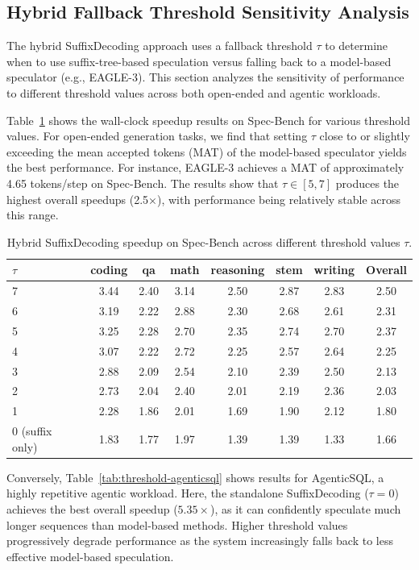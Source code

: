 \subsection{Hybrid Fallback Threshold Sensitivity Analysis}
\label{sec:threshold-sensitivity}

The hybrid SuffixDecoding approach uses a fallback threshold $\tau$ to determine when to use suffix-tree-based speculation versus falling back to a model-based speculator (e.g., EAGLE-3). This section analyzes the sensitivity of performance to different threshold values across both open-ended and agentic workloads.

Table~\ref{tab:threshold-specbench} shows the wall-clock speedup results on Spec-Bench for various threshold values. For open-ended generation tasks, we find that setting $\tau$ close to or slightly exceeding the mean accepted tokens (MAT) of the model-based speculator yields the best performance. For instance, EAGLE-3 achieves a MAT of approximately 4.65 tokens/step on Spec-Bench. The results show that $\tau \in [5, 7]$ produces the highest overall speedups (2.5×), with performance being relatively stable across this range.

\begin{table}[h]
\centering
\caption{Hybrid SuffixDecoding speedup on Spec-Bench across different threshold values $\tau$.}
\label{tab:threshold-specbench}
\small
\begin{tabular}{lccccccc}
\toprule
$\tau$ & coding & qa & math & reasoning & stem & writing & Overall \\
\midrule
7 & 3.44 & 2.40 & 3.14 & 2.50 & 2.87 & 2.83 & 2.50 \\
6 & 3.19 & 2.22 & 2.88 & 2.30 & 2.68 & 2.61 & 2.31 \\
5 & 3.25 & 2.28 & 2.70 & 2.35 & 2.74 & 2.70 & 2.37 \\
4 & 3.07 & 2.22 & 2.72 & 2.25 & 2.57 & 2.64 & 2.25 \\
3 & 2.88 & 2.09 & 2.54 & 2.10 & 2.39 & 2.50 & 2.13 \\
2 & 2.73 & 2.04 & 2.40 & 2.01 & 2.19 & 2.36 & 2.03 \\
1 & 2.28 & 1.86 & 2.01 & 1.69 & 1.90 & 2.12 & 1.80 \\
0 (suffix only) & 1.83 & 1.77 & 1.97 & 1.39 & 1.39 & 1.33 & 1.66 \\
\bottomrule
\end{tabular}
\end{table}

Conversely, Table~\ref{tab:threshold-agenticsql} shows results for AgenticSQL, a highly repetitive agentic workload. Here, the standalone SuffixDecoding ($\tau = 0$) achieves the best overall speedup ($5.35\times$), as it can confidently speculate much longer sequences than model-based methods. Higher threshold values progressively degrade performance as the system increasingly falls back to less effective model-based speculation.

